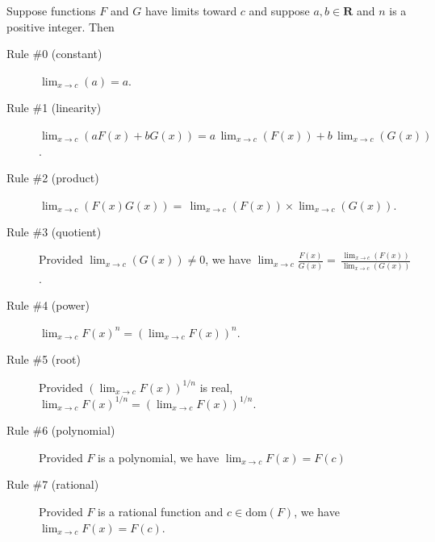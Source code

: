 \documentclass[12pt,fleqn]{exam}
\newcommand{\reals}{\mathbf{R}}
\newcommand{\dom}{\mbox{dom}}
\begin{document}
\newpage
\noindent Suppose functions $F$ and $G$ have limits toward $c$ and suppose $a,b \in \reals$ and $n$ is a positive integer. Then

\begin{description}

\item[Rule \#0 (constant)] $  \displaystyle \lim_{x \to c} (a) = a$.
 
\item[Rule \#1 (linearity)] $ \displaystyle \lim_{x \to c} (a F(x) + b G(x)) = a  \, \lim_{x \to c} (F(x)) + b \, \lim_{x \to c} (G(x)) $.

\item [Rule \#2 (product)]$ \displaystyle \lim_{x \to c} (F(x)  G(x)) = \, \lim_{x \to c} (F(x))  \times \lim_{x \to c} (G(x)) $.

\item [Rule \#3 (quotient)] Provided $\displaystyle  \lim_{x \to c} (G(x)) \neq 0$, we have $\displaystyle \lim_{x \to c} \frac{F(x)}{G(x)} = \, \frac{\lim_{x \to c} (F(x))}{ \lim_{x \to c} (G(x)) } $.

\item [Rule \#4 (power)]  $ \displaystyle \lim_{x \to c} F(x)^n  = \left(\lim_{x \to c} F(x) \right)^n  $.

\item [Rule \#5 (root)]  Provided $ \displaystyle  \left(\lim_{x \to c} F(x) \right)^{1/n} $ is real,  $ \displaystyle \lim_{x \to c} F(x)^{1/n}  = \left(\lim_{x \to c} F(x) \right)^{1/n}  $.

\item [Rule \#6 (polynomial)]  Provided $F$ is a polynomial, we have  $ \displaystyle \lim_{x \to c} F(x) = F(c)$

 \item [Rule \#7 (rational)]  Provided $F$ is a rational function and $c \in \dom(F)$, we have  \mbox{$ \displaystyle \lim_{x \to c} F(x) = F(c)$.}
\end{description}
\end{document}
